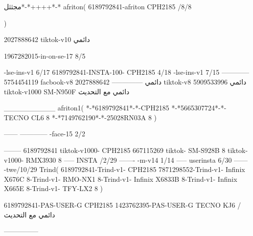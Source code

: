 مجثثل*-*++++*-*
afriton(
6189792841-afriton CPH2185  /8/8

)

2027888642 tiktok-v10
دائمي

1967282015-in-on-se-17 8/5

-lse-ins-v1 6/17
6189792841-INSTA-100- CPH2185 4/18
-lse-ins-v1 7/15
------------
5754454119 facbook-v8
دائمي
--------------
2027888642 tiktok-v8
دائمي
5909533996 tiktok-v1000  SM-N950F
دائمي مع التحديث

__________
afriton1(
*-*6189792841*-*-CPH2185
*-*5665307724*-*-TECNO CL6  8\1
*-*7149762190*-*-25028RN03A  8
)


------
------------
-face-15 2/2

--------
6189792841 tiktok-v1000- CPH2185 
667115269 tiktok- SM-S928B  8 tiktok-v1000- RMX3930  8\7
-----
 INSTA /2/29
-------
-m-v14 1/14
-----
userinsta 6/30
------
-twe/10/29
Trind(
6189792841-Trind-v1- CPH2185 
7871298552-Trind-v1-  Infinix X676C  8-Trind-v1-  RMO-NX1  8-Trind-v1-  Infinix X6833B  8-Trind-v1-  Infinix X665E  8-Trind-v1-  TFY-LX2  8\6
)


6189792841-PAS-USER-G CPH2185 
1423762395-PAS-USER-G TECNO KJ6  /دائمي مع التحديث

    ---------------
